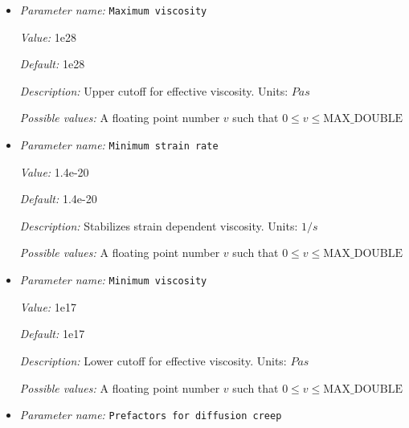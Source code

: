 \begin{itemize}
{\it Value:} 40


{\it Default:} 40


{\it Description:} Maximum number of iterations to find the correct diffusion/dislocation strain rate ratio.


{\it Possible values:} An integer $n$ such that $0\leq n \leq 2147483647$
\item {\it Parameter name:} {\tt Maximum viscosity}
\label{parameters:Material model/Diffusion dislocation/Maximum viscosity}


{\it Value:} 1e28


{\it Default:} 1e28


{\it Description:} Upper cutoff for effective viscosity. Units: $Pa s$


{\it Possible values:} A floating point number $v$ such that $0 \leq v \leq \text{MAX\_DOUBLE}$
\item {\it Parameter name:} {\tt Minimum strain rate}
\label{parameters:Material model/Diffusion dislocation/Minimum strain rate}


{\it Value:} 1.4e-20


{\it Default:} 1.4e-20


{\it Description:} Stabilizes strain dependent viscosity. Units: $1 / s$


{\it Possible values:} A floating point number $v$ such that $0 \leq v \leq \text{MAX\_DOUBLE}$
\item {\it Parameter name:} {\tt Minimum viscosity}
\label{parameters:Material model/Diffusion dislocation/Minimum viscosity}


{\it Value:} 1e17


{\it Default:} 1e17


{\it Description:} Lower cutoff for effective viscosity. Units: $Pa s$


{\it Possible values:} A floating point number $v$ such that $0 \leq v \leq \text{MAX\_DOUBLE}$
\item {\it Parameter name:} {\tt Prefactors for diffusion creep}
\label{parameters:Material model/Diffusion dislocation/Prefactors for diffusion creep}



\end{itemize}
